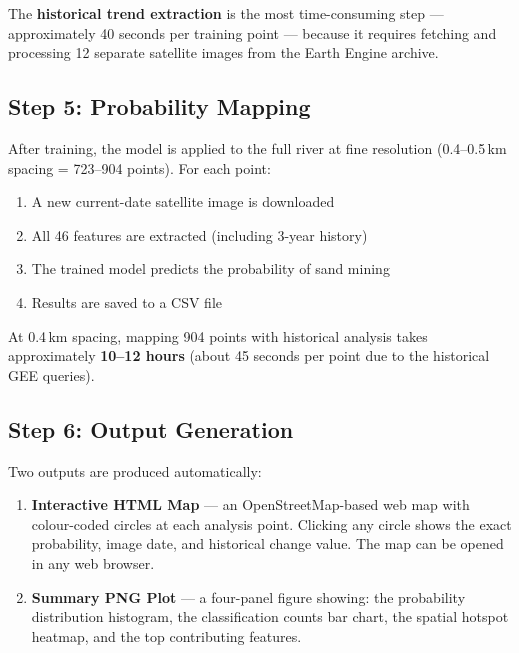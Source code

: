 \documentclass[12pt, a4paper]{article}
\begin{document}
The \textbf{historical trend extraction} is the most time-consuming
step --- approximately 40 seconds per training point --- because it
requires fetching and processing 12 separate satellite images from
the Earth Engine archive.

\subsection{Step 5: Probability Mapping}

After training, the model is applied to the full river at fine
resolution (0.4--0.5\,km spacing = 723--904 points). For each point:

\begin{enumerate}[noitemsep]
  \item A new current-date satellite image is downloaded
  \item All 46 features are extracted (including 3-year history)
  \item The trained model predicts the probability of sand mining
  \item Results are saved to a CSV file
\end{enumerate}

At 0.4\,km spacing, mapping 904 points with historical analysis takes
approximately \textbf{10--12 hours} (about 45 seconds per point due
to the historical GEE queries).

\subsection{Step 6: Output Generation}

Two outputs are produced automatically:

\begin{enumerate}
  \item \textbf{Interactive HTML Map} --- an OpenStreetMap-based web map
        with colour-coded circles at each analysis point. Clicking any
        circle shows the exact probability, image date, and historical
        change value. The map can be opened in any web browser.

  \item \textbf{Summary PNG Plot} --- a four-panel figure showing:
        the probability distribution histogram, the classification
        counts bar chart, the spatial hotspot heatmap, and the top
        contributing features.
\end{enumerate}

\end{document}
